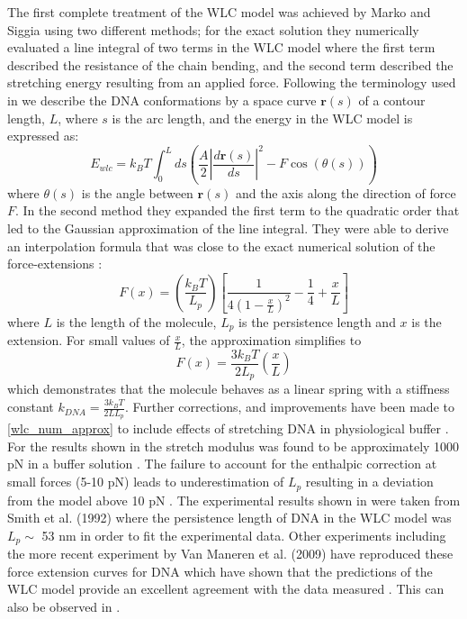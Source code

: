 %
The first complete treatment of the WLC model was achieved by Marko and Siggia using two different methods; for the exact solution they numerically evaluated a line integral of two terms in the WLC model where the first term described the resistance of the chain bending, and the second term described the stretching energy resulting from an applied force. Following the terminology used in \cite{Marko1995} we describe the DNA conformations by a space curve $\mathbf{r}(s)$ of a contour length, $L$, where $s$ is the arc length, and the energy in the WLC model is expressed as:
%
\begin{equation}
E_{wlc}=k_{B}T \int_{0}^{L}ds \left(  \frac{A}{2}\left|\frac{d\mathbf{r}\left(s\right)}{ds}\right|^{2} -F\cos\left(\theta\left(s\right)\right)\right)
\end{equation}
%
where $\theta\left(s\right)$ is the angle between $\mathbf{r}(s)$ and the axis along the direction of force $F$.  In the second method they expanded the first term to the quadratic order that led to the Gaussian approximation of the line integral. They were able to derive an interpolation formula that was close to the exact numerical solution of the force-extensions  \cite{Marko1995,Bustamante1994}:
%
\begin{equation}
\label{wlc_num_approx}
F\left(x\right)=\left(\frac{k_{B}T}{L_{p}}\right)\left[\frac{1}{4\left(1-\frac{x}{L}\right)^{2}}-\frac{1}{4}+\frac{x}{L}\right]
\end{equation}
%
where $L$ is the length of the molecule, $L_{p}$ is the persistence length and $x$ is the extension. For small values of $\frac{x}{L}$, the approximation simplifies to
%
\begin{equation}
\label{wlc_num_approx_small}
F\left(x\right)=\frac{3 k_{B}T}{2L_{p}}\left(\frac{x}{L}\right)
\end{equation}
%
which demonstrates that the molecule behaves as a linear spring with a stiffness constant $k_{DNA}=\frac{3 k_{B}T}{2LL_{p}}$. Further corrections, and improvements have been made to \eqref{wlc_num_approx} to include effects of stretching DNA in physiological buffer \cite{Wang1997,Bouchiat1999}. For the results shown in  the stretch modulus was found to be approximately 1000 pN in a buffer solution \cite{Bustamante2000}. The failure to account for the enthalpic correction at small forces (5-10 pN) leads to underestimation of $L_{p}$ resulting in a deviation from the model above 10 pN \cite{Bouchiat1999,Wang1997}. The experimental results shown in  were taken from Smith et al. (1992) where the persistence length of DNA in the WLC model was $L_{p}\sim$ 53 nm in order to fit the experimental data. Other experiments including the more recent experiment by Van Maneren et al. (2009) have reproduced these force extension curves for DNA which have shown that the predictions of the WLC model provide an excellent agreement with the data measured \cite{Cluzel1996,Wang1997,Smith1996,VanMameren2009}. This can also be observed in . 
